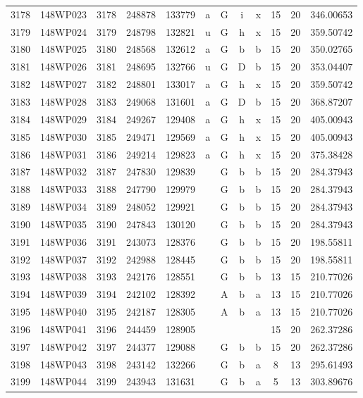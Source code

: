 \begin{tabular}{|*{12}{c|}}
3178 & 148WP023 & 3178 & 248878 & 133779 & a & G & i & x & 15 & 20 & 346.00653 \\ 
3179 & 148WP024 & 3179 & 248798 & 132821 & u & G & h & x & 15 & 20 & 359.50742 \\ 
3180 & 148WP025 & 3180 & 248568 & 132612 & a & G & b & b & 15 & 20 & 350.02765 \\ 
3181 & 148WP026 & 3181 & 248695 & 132766 & u & G & D & b & 15 & 20 & 353.04407 \\ 
3182 & 148WP027 & 3182 & 248801 & 133017 & a & G & h & x & 15 & 20 & 359.50742 \\ 
3183 & 148WP028 & 3183 & 249068 & 131601 & a & G & D & b & 15 & 20 & 368.87207 \\ 
3184 & 148WP029 & 3184 & 249267 & 129408 & a & G & h & x & 15 & 20 & 405.00943 \\ 
3185 & 148WP030 & 3185 & 249471 & 129569 & a & G & h & x & 15 & 20 & 405.00943 \\ 
3186 & 148WP031 & 3186 & 249214 & 129823 & a & G & h & x & 15 & 20 & 375.38428 \\ 
3187 & 148WP032 & 3187 & 247830 & 129839 &  & G & b & b & 15 & 20 & 284.37943 \\ 
3188 & 148WP033 & 3188 & 247790 & 129979 &  & G & b & b & 15 & 20 & 284.37943 \\ 
3189 & 148WP034 & 3189 & 248052 & 129921 &  & G & b & b & 15 & 20 & 284.37943 \\ 
3190 & 148WP035 & 3190 & 247843 & 130120 &  & G & b & b & 15 & 20 & 284.37943 \\ 
3191 & 148WP036 & 3191 & 243073 & 128376 &  & G & b & b & 15 & 20 & 198.55811 \\ 
3192 & 148WP037 & 3192 & 242988 & 128445 &  & G & b & b & 15 & 20 & 198.55811 \\ 
3193 & 148WP038 & 3193 & 242176 & 128551 &  & G & b & b & 13 & 15 & 210.77026 \\ 
3194 & 148WP039 & 3194 & 242102 & 128392 &  & A & b & a & 13 & 15 & 210.77026 \\ 
3195 & 148WP040 & 3195 & 242187 & 128305 &  & A & b & a & 13 & 15 & 210.77026 \\ 
3196 & 148WP041 & 3196 & 244459 & 128905 &  &  &  &  & 15 & 20 & 262.37286 \\ 
3197 & 148WP042 & 3197 & 244377 & 129088 &  & G & b & b & 15 & 20 & 262.37286 \\ 
3198 & 148WP043 & 3198 & 243142 & 132266 &  & G & b & a & 8 & 13 & 295.61493 \\ 
3199 & 148WP044 & 3199 & 243943 & 131631 &  & G & b & a & 5 & 13 & 303.89676 \\ 

\end{tabular}
